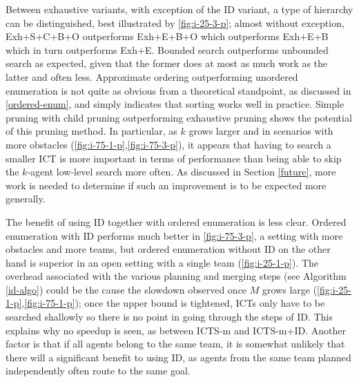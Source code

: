\documentclass[english]{article}
\begin{document}
	Between exhaustive variants, with exception of the ID variant, a type of hierarchy can be distinguished, best illustrated by \ref{fig:i-25-3-p}; almost without exception, Exh+S+C+B+O outperforms Exh+E+B+O which outperforms Exh+E+B which in turn outperforms Exh+E. Bounded search outperforms unbounded search as expected, given that the former does at most as much work as the latter and often less. Approximate ordering outperforming unordered enumeration is not quite as obvious from a theoretical standpoint, as discussed in \ref{ordered-enum}, and simply indicates that sorting works well in practice. Simple pruning with child pruning outperforming exhaustive pruning shows the potential of this pruning method. In particular, as $k$ grows larger and in scenarios with more obstacles (\ref{fig:i-75-1-p},\ref{fig:i-75-3-p}), it appears that having to search a smaller ICT is more important in terms of performance than being able to skip the $k$-agent low-level search more often. As discussed in Section \ref{future}, more work is needed to determine if such an improvement is to be expected more generally.
	
	The benefit of using ID together with ordered enumeration is less clear. Ordered enumeration with ID performs much better in \ref{fig:i-75-3-p}, a setting with more obstacles and more teams, but ordered enumeration without ID on the other hand is superior in an open setting with a single team (\ref{fig:i-25-1-p}). The overhead associated with the various planning and merging steps (see Algorithm \ref{id-algo}) could be the cause the slowdown observed once $M$ grows large (\ref{fig:i-25-1-p},\ref{fig:i-75-1-p}); once the upper bound is tightened, ICTs only have to be searched shallowly so there is no point in going through the steps of ID. This explains why no speedup is seen, as between ICTS-m and ICTS-m+ID. Another factor is that if all agents belong to the same team, it is somewhat unlikely that there will a significant benefit to using ID, as agents from the same team planned independently often route to the same goal.
	
\end{document}
